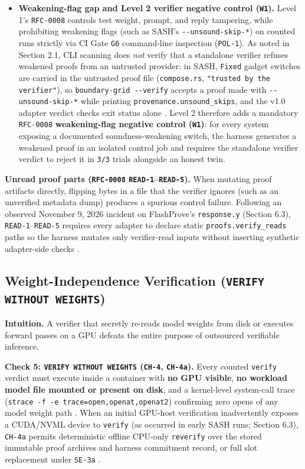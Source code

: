 \documentclass[11pt,letterpaper]{article}
\begin{document}
\begin{itemize}
\item \textbf{Weakening-flag gap and Level 2 verifier negative control (\texttt{W1}).} Level 1's \texttt{RFC-0008} controls test weight, prompt, and reply tampering, while prohibiting weakening flags (such as SASH's \texttt{-{}-unsound-\allowbreak{}skip-*}) on counted runs strictly via CI Gate \texttt{G6} command-line inspection (\texttt{POL-1}). As noted in Section 2.1, CLI scanning does \textit{not} verify that a standalone verifier refuses weakened proofs from an untrusted provider: in SASH, \texttt{Fixed} gadget switches are carried in the untrusted proof file (\texttt{compose.\allowbreak{}rs}, \texttt{"trusted by the verifier"}), so \texttt{boundary-\allowbreak{}grid -{}-verify} accepts a proof made with \texttt{-{}-unsound-\allowbreak{}skip-*} while printing \texttt{provenance.\allowbreak{}unsound\_\allowbreak{}skips}, and the v1.0 adapter verdict checks exit status alone \cite{sash2026}. Level 2 therefore adds a mandatory \texttt{RFC-0008} \textbf{weakening-flag negative control (\texttt{W1})}: for every system exposing a documented soundness-weakening switch, the harness generates a weakened proof in an isolated control job and requires the standalone verifier verdict to reject it in \texttt{3/\allowbreak{}3} trials alongside an honest twin.
\end{itemize}

\textbf{Unread proof parts (\texttt{RFC-0008} \texttt{READ-1}--\texttt{READ-5}).} When mutating proof artifacts directly, flipping bytes in a file that the verifier ignores (such as an unverified metadata dump) produces a spurious control failure. Following an observed November 9, 2026 incident on FlashProve's \texttt{response.\allowbreak{}y} (Section 6.3), \texttt{READ-1}--\texttt{READ-5} requires every adapter to declare static \texttt{proofs.\allowbreak{}verify\_\allowbreak{}reads} paths so the harness mutates only verifier-read inputs without inserting synthetic adapter-side checks \cite{iproofs2026}.

\subsection{Weight-Independence Verification (\texttt{VERIFY WITHOUT WEIGHTS})}

\textbf{Intuition.} A verifier that secretly re-reads model weights from disk or executes forward passes on a GPU defeats the entire purpose of outsourced verifiable inference.

\textbf{Check 5: \texttt{VERIFY WITHOUT WEIGHTS} (\texttt{CH-4}, \texttt{CH-4a}).} Every counted \texttt{verify} verdict must execute inside a container with \textbf{no GPU visible}, \textbf{no workload model file mounted or present on disk}, and a kernel-level system-call trace (\texttt{strace -\allowbreak{}f -\allowbreak{}e trace=open,openat,openat2}) confirming zero opens of any model weight path \cite{iproofs2026}. When an initial GPU-host verification inadvertently exposes a CUDA/NVML device to \texttt{verify} (as occurred in early SASH runs; Section 6.3), \texttt{CH-4a} permits deterministic offline CPU-only \texttt{reverify} over the stored immutable proof archives and harness commitment record, or full slot replacement under \texttt{SE-3a} \cite{iproofs2026}.
\end{document}
